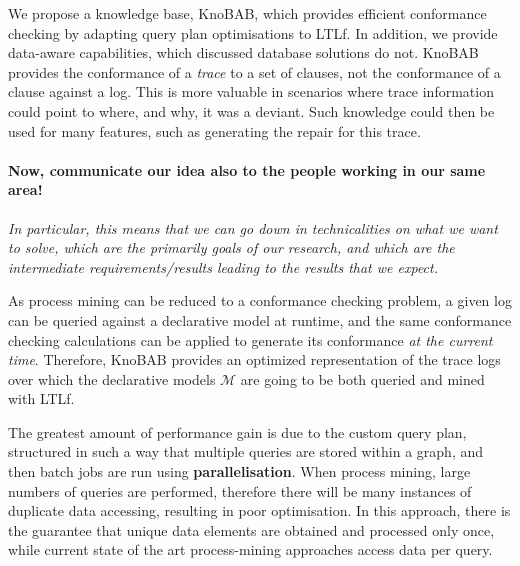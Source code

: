 We propose a knowledge base, KnoBAB, which provides efficient conformance checking by adapting query plan optimisations \cite{BellatrecheKB21} to LTLf. In addition, we provide data-aware capabilities, which discussed database solutions do not. KnoBAB provides the conformance of a \emph{trace} to a set of clauses, not the conformance of a clause against a log. This is more valuable in scenarios where trace information could point to where, and why, it was a deviant. Such knowledge could then be used for many features, such as generating the repair for this trace.
\medskip


\paragraph*{Now, communicate our idea also to the people working in our same area!} \textit{In particular, this means that we can go down in technicalities on what we want to solve, which are the primarily goals of our research, and which are the intermediate requirements/results leading to the results that we expect.} 

As process mining can be reduced to a conformance checking problem, a given log can be queried against a declarative model at runtime, and the same conformance checking calculations can be applied to generate its conformance \emph{at the current time}. Therefore, KnoBAB provides an optimized representation of the trace logs over which the declarative models $\mathcal{M}$ are going to be both queried and mined with LTLf. 

The greatest amount of performance gain is due to the custom query plan, structured in such a way that multiple queries are stored within a graph, and then batch jobs are run using \textbf{parallelisation}. When process mining, large numbers of queries are performed, therefore there will be many instances of duplicate data accessing, resulting in poor optimisation. In this approach, there is the guarantee that unique data elements are obtained and processed only once, while current state of the art process-mining approaches access data per query. 
